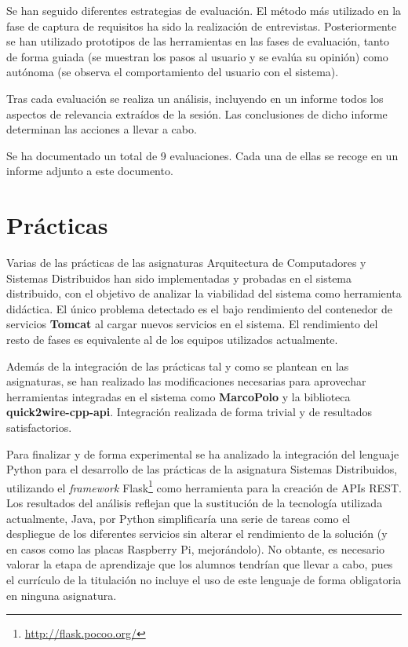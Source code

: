 Se han seguido diferentes estrategias de evaluación. El método más utilizado en la fase de captura de requisitos ha sido la realización de entrevistas. Posteriormente se han utilizado prototipos de las herramientas en las fases de evaluación, tanto de forma guiada (se muestran los pasos al usuario y se evalúa su opinión) como autónoma (se observa el comportamiento del usuario con el sistema).

Tras cada evaluación se realiza un análisis, incluyendo en un informe todos los aspectos de relevancia extraídos de la sesión. Las conclusiones de dicho informe determinan las acciones a llevar a cabo.

Se ha documentado un total de 9 evaluaciones. Cada una de ellas se recoge en un informe adjunto a este documento.

\section{Prácticas}

Varias de las prácticas de las asignaturas Arquitectura de Computadores y Sistemas Distribuidos han sido implementadas y probadas en el sistema distribuido, con el objetivo de analizar la viabilidad del sistema como herramienta didáctica. El único problema detectado es el bajo rendimiento del contenedor de servicios \textbf{Tomcat} al cargar nuevos servicios en el sistema. El rendimiento del resto de fases es equivalente al de los equipos utilizados actualmente.

Además de la integración de las prácticas tal y como se plantean en las asignaturas, se han realizado las modificaciones necesarias para aprovechar herramientas integradas en el sistema como \textbf{MarcoPolo} y la biblioteca \textbf{quick2wire-cpp-api}. Integración realizada de forma trivial y de resultados satisfactorios.

Para finalizar y de forma experimental se ha analizado la integración del lenguaje Python para el desarrollo de las prácticas de la asignatura Sistemas Distribuidos, utilizando el \textit{framework} Flask\footnote{\href{http://flask.pocoo.org/}{http://flask.pocoo.org/}} como herramienta para la creación de APIs REST. Los resultados del análisis reflejan que la sustitución de la tecnología utilizada actualmente, Java, por Python simplificaría una serie de tareas como el despliegue de los diferentes servicios sin alterar el rendimiento de la solución (y en casos como las placas Raspberry Pi, mejorándolo). No obtante, es necesario valorar la etapa de aprendizaje que los alumnos tendrían que llevar a cabo, pues el currículo de la titulación no incluye el uso de este lenguaje de forma obligatoria en ninguna asignatura.

